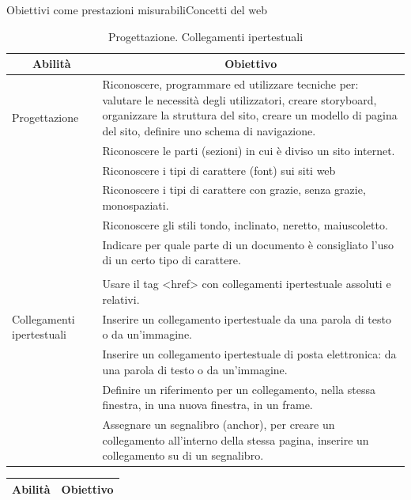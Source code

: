 \documentclass[italian]{beamer}
\begin{document}
\begin{frame}[allowframebreaks]{Obiettivi come prestazioni misurabili}{Concetti del web}
	\framebreak
	
	{\tiny
	\begin{table}
		\begin{tabular}{@{}p{}p{}@{}} \toprule
			\multicolumn{1}{c}{Abilit\`a} & \multicolumn{1}{c}{Obiettivo} \\ \midrule
			
			\multirow{2}{*}{\parbox{0.2\textwidth}{Progettazione}}
			& Riconoscere, programmare ed utilizzare tecniche
			per: valutare le necessit\`a degli utilizzatori, creare
			storyboard, organizzare la struttura del sito, creare
			un modello di pagina del sito, definire uno schema
			di navigazione.\\
			& Riconoscere le parti (sezioni) in cui \`e diviso un sito internet.\\ 
			& Riconoscere i tipi di carattere (font) sui siti web\\
			& Riconoscere i tipi di carattere con grazie, senza grazie, monospaziati.\\
			& Riconoscere gli stili tondo, inclinato, neretto, maiuscoletto.\\
			& Indicare per quale parte di un documento \`e consigliato l'uso di un certo tipo di carattere.\\
			
			\\
			
			\multirow{3}{*}{\parbox{0.2\textwidth}{Collegamenti ipertestuali}}
			
			& Usare il  tag <href> con collegamenti ipertestuale
			assoluti e relativi.\\
			& Inserire un collegamento
			ipertestuale da una parola di testo o da
			un'immagine.\\
			& Inserire un collegamento
			ipertestuale di posta elettronica: da una parola di
			testo o da un'immagine.\\
			& Definire un riferimento per un collegamento, nella
			stessa finestra, in una nuova finestra, in un frame.\\
			& Assegnare un segnalibro (anchor), per creare un
			collegamento all'interno della stessa pagina, inserire
			un collegamento su di un segnalibro.
			\\ \bottomrule
		\end{tabular}
		\caption{Progettazione. Collegamenti ipertestuali}
	\end{table}
	}
	
	{\tiny
		\begin{table}
			\begin{tabular}{@{}p{}p{}@{}} \toprule
				\multicolumn{1}{c}{Abilit\`a} & \multicolumn{1}{c}{Obiettivo} \\ \midrule
				

\end{tabular}
\end{table}}
\end{frame}
\end{document}

